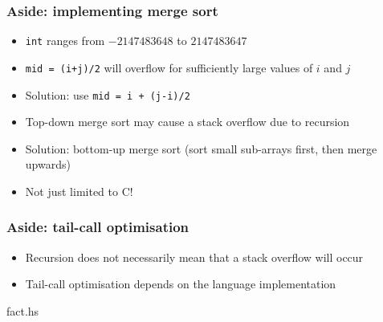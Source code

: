 \documentclass{beamer}
\begin{document}
\begin{frame}
 \frametitle{Aside: implementing merge sort}
 \begin{itemize}
  \item \texttt{int} ranges from $-2147483648$ to $2147483647$
  \item \texttt{mid = (i+j)/2} will overflow for sufficiently large
        values of $i$ and $j$
  \item Solution: use \texttt{mid = i + (j-i)/2} \pause
  \item Top-down merge sort may cause a stack overflow due to recursion
  \item Solution: bottom-up merge sort (sort small sub-arrays first,
        then merge upwards)
  \item Not just limited to C!
 \end{itemize}
\end{frame}

\begin{frame}[fragile]
 \frametitle{Aside: tail-call optimisation}
 \begin{itemize}
  \item Recursion does not necessarily mean that a stack overflow will
        occur
  \item Tail-call optimisation depends on the language implementation
 \end{itemize}
 \begin{lstinputlisting}[language=Haskell, firstline=3, lastline=13]{fact.hs}
 \end{lstinputlisting}
\end{frame}
\end{document}
